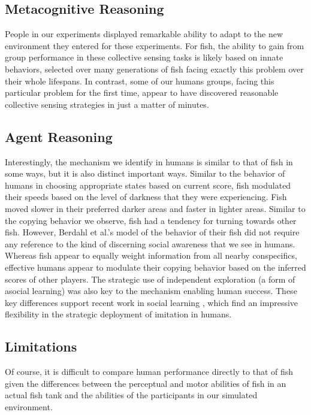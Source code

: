 \documentclass[12pt,letterpaper]{article}
\begin{document}
\subsection{Metacognitive Reasoning}

People in our experiments displayed remarkable ability to adapt to the new environment they entered for these experiments. For fish, the ability to
gain from group performance in these collective sensing tasks is
likely based on innate behaviors, selected over many generations of
fish facing exactly this problem over their whole lifespans.  In
contrast, some of our humans groups, facing this particular problem
for the first time, appear to have discovered reasonable collective
sensing strategies in just a matter of minutes.


\subsection{Agent Reasoning}

Interestingly, the mechanism we identify in humans is similar to that
of fish in some ways, but it is also distinct important ways.  Similar
to the behavior of humans in choosing appropriate states based on
current score, fish modulated their speeds based on the level of
darkness that they were experiencing.  Fish moved slower in their
preferred darker areas and faster in lighter areas.  Similar to the
copying behavior we observe, fish had a tendency for turning towards
other fish.  However, Berdahl et al.'s model of the behavior of their
fish did not require any reference to the kind of discerning social
awareness that we see in humans.  Whereas fish appear to equally
weight information from all nearby conspecifics, effective humans
appear to modulate their copying behavior based on the inferred scores
of other players. The strategic use of independent exploration (a form
of asocial learning) was also key to the mechanism enabling human
success. These key differences support recent work in social learning
\cite{wisdom_social_2013, mcelreath_beyond_2008}, which find an
impressive flexibility in the strategic deployment of imitation in
humans. 

\subsection{Limitations}

Of course, it is difficult to compare human performance
directly to that of fish given the differences between the perceptual
and motor abilities of fish in an actual fish tank and the abilities
of the participants in our simulated environment.  
\end{document}
